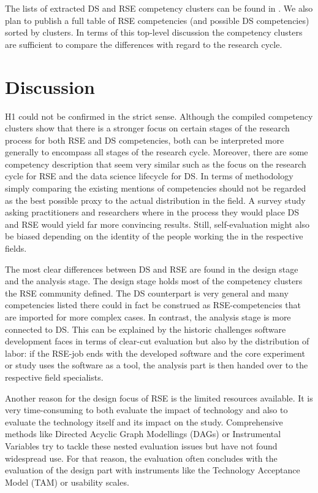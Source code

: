 \documentclass[
        english,biblatex
    ]{lni}
\begin{document}
    The lists of extracted DS and RSE competency clusters can be found
    in \autocite{ds2rse2025}. We also plan to publish a full table of
    RSE competencies (and possible DS competencies) sorted by clusters.
    In terms of this top-level discussion the competency clusters are
    sufficient to compare the differences with regard to the research
    cycle.

    \section{Discussion}\label{discussion}

    H1 could not be confirmed in the strict sense. Although the compiled
    competency clusters show that there is a stronger focus on certain
    stages of the research process for both RSE and DS competencies,
    both can be interpreted more generally to encompass all stages of
    the research cycle. Moreover, there are some competency description
    that seem very similar such as the focus on the research cycle for
    RSE and the data science lifecycle for DS. In terms of methodology
    simply comparing the existing mentions of competencies should not be
    regarded as the best possible proxy to the actual distribution in
    the field. A survey study asking practitioners and researchers where
    in the process they would place DS and RSE would yield far more
    convincing results. Still, self-evaluation might also be biased
    depending on the identity of the people working the in the
    respective fields.

    The most clear differences between DS and RSE are found in the
    design stage and the analysis stage. The design stage holds most of
    the competency clusters the RSE community defined. The DS
    counterpart is very general and many competencies listed there could
    in fact be construed as RSE-competencies that are imported for more
    complex cases. In contrast, the analysis stage is more connected to
    DS. This can be explained by the historic challenges software
    development faces in terms of clear-cut evaluation but also by the
    distribution of labor: if the RSE-job ends with the developed
    software and the core experiment or study uses the software as a
    tool, the analysis part is then handed over to the respective field
    specialists.

    Another reason for the design focus of RSE is the limited resources
    available. It is very time-consuming to both evaluate the impact of
    technology and also to evaluate the technology itself and its impact
    on the study. Comprehensive methods like Directed Acyclic Graph
    Modellings (DAGs) or Instrumental Variables try to tackle these
    nested evaluation issues but have not found widespread use. For that
    reason, the evaluation often concludes with the evaluation of the
    design part with instruments like the Technology Acceptance Model
    (TAM) or usability scales.
\end{document}
